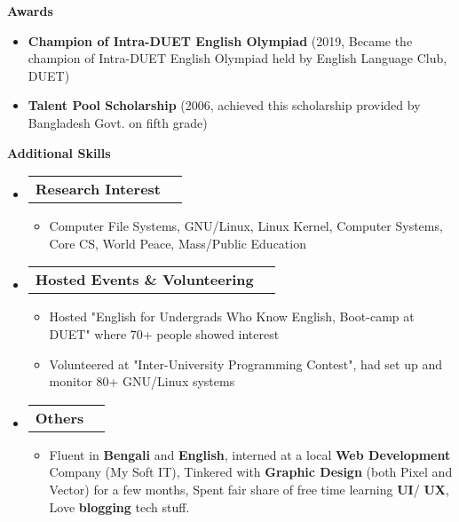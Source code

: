 \documentclass[letterpaper,10pt]{article}
\makeatletter
\newcommand{\resheading}[1]{{\large \colorbox{mygrey}{\begin{minipage}{\textwidth}{\textbf{#1 \vphantom{p\^{E}}}}\end{minipage}}}}
\newcommand{\ressubheading}[4]{
	\begin{tabular*}{7.1in}{l@{\extracolsep{\fill}}r}
		\textbf{#1} & \textit{#4} \\
	\end{tabular*}\vspace{-6pt}}
\makeatother
\begin{document}
	\vspace{0.3in}
	
	\resheading{Awards}
	\begin{itemize}
				
		\item \textbf{Champion of Intra-DUET English Olympiad} (2019, Became the champion of Intra-DUET English Olympiad held by English Language Club, DUET)
	
		\item \textbf{Talent Pool Scholarship} (2006, achieved this scholarship provided by Bangladesh Govt. on fifth grade)

	\end{itemize}

	
	\vspace{0.2in}
	
	\resheading{Additional Skills}
	\begin{itemize}
		\item \ressubheading{Research Interest}{}{}{}
		\begin{itemize}
			\item Computer File Systems, GNU/Linux, Linux Kernel, Computer Systems, Core CS,  World Peace, Mass/Public Education
		\end{itemize}
		
		\item \ressubheading{Hosted Events \& Volunteering}{}{}{}
		\begin{itemize}
			\item Hosted "English for Undergrads Who Know English, Boot-camp at DUET" where 70+ people showed interest
			
			\item Volunteered at "Inter-University Programming Contest", had set up and monitor 80+ GNU/Linux systems
		\end{itemize}

	
		\item \ressubheading{Others}{}{}{}
		\begin{itemize}
			\item Fluent in \textbf{Bengali} and \textbf{English}, interned at a local \textbf{Web Development} Company (My Soft IT), Tinkered with \textbf{Graphic Design} (both Pixel and Vector) for a few months, Spent fair share of free time learning \textbf{UI}/ \textbf{UX}, Love \textbf{blogging} tech stuff.
		\end{itemize}


	\end{itemize}
\vfill
\end{document}
